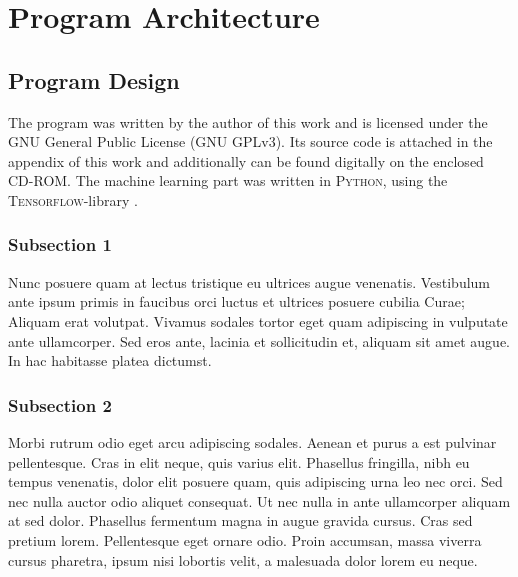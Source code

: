 
\chapter{Program Architecture} %

\label{ChapterX} %


\section{Program Design}

The program was written by the author of this work and is licensed under the GNU General Public License (GNU GPLv3). Its source code is attached in the appendix of this work and additionally can be found digitally on the enclosed CD-ROM. The machine learning part was written in \textsc{Python}, using the \textsc{Tensorflow}-library \parencite{abadi_tensorflow:_2015}.
\subsection{Subsection 1}

Nunc posuere quam at lectus tristique eu ultrices augue venenatis. Vestibulum ante ipsum primis in faucibus orci luctus et ultrices posuere cubilia Curae; Aliquam erat volutpat. Vivamus sodales tortor eget quam adipiscing in vulputate ante ullamcorper. Sed eros ante, lacinia et sollicitudin et, aliquam sit amet augue. In hac habitasse platea dictumst.


\subsection{Subsection 2}
Morbi rutrum odio eget arcu adipiscing sodales. Aenean et purus a est pulvinar pellentesque. Cras in elit neque, quis varius elit. Phasellus fringilla, nibh eu tempus venenatis, dolor elit posuere quam, quis adipiscing urna leo nec orci. Sed nec nulla auctor odio aliquet consequat. Ut nec nulla in ante ullamcorper aliquam at sed dolor. Phasellus fermentum magna in augue gravida cursus. Cras sed pretium lorem. Pellentesque eget ornare odio. Proin accumsan, massa viverra cursus pharetra, ipsum nisi lobortis velit, a malesuada dolor lorem eu \cite{mnih_human-level_2015} neque. \cite{bojarski_end_2016}

